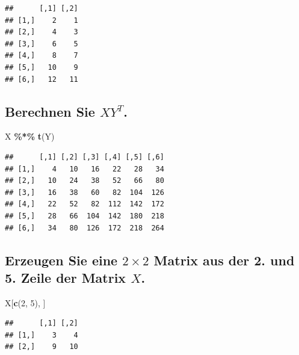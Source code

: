 \documentclass[12pt,a4paper]{article}
\newenvironment{Shaded}{\begin{snugshade}}{\end{snugshade}}
\newcommand{\DecValTok}[1]{\textcolor[rgb]{0.00,0.00,0.81}{#1}}
\newcommand{\FunctionTok}[1]{\textcolor[rgb]{0.13,0.29,0.53}{\textbf{#1}}}
\newcommand{\NormalTok}[1]{#1}
\newcommand{\SpecialCharTok}[1]{\textcolor[rgb]{0.81,0.36,0.00}{\textbf{#1}}}
\begin{document}
\begin{verbatim}
##      [,1] [,2]
## [1,]    2    1
## [2,]    4    3
## [3,]    6    5
## [4,]    8    7
## [5,]   10    9
## [6,]   12   11
\end{verbatim}

\vspace{0.5cm}

\subsection{\texorpdfstring{Berechnen Sie
\(XY^{T}\).}{Berechnen Sie XY\^{}\{T\}.}}\label{berechnen-sie-xyt.}

\begin{Shaded}
\begin{Highlighting}[]
\NormalTok{    X }\SpecialCharTok{\%*\%} \FunctionTok{t}\NormalTok{(Y)}
\end{Highlighting}
\end{Shaded}

\begin{verbatim}
##      [,1] [,2] [,3] [,4] [,5] [,6]
## [1,]    4   10   16   22   28   34
## [2,]   10   24   38   52   66   80
## [3,]   16   38   60   82  104  126
## [4,]   22   52   82  112  142  172
## [5,]   28   66  104  142  180  218
## [6,]   34   80  126  172  218  264
\end{verbatim}

\vspace{0.5cm}

\subsection{\texorpdfstring{Erzeugen Sie eine \(2 \times 2\) Matrix aus
der 2. und 5. Zeile der Matrix
\(X\).}{Erzeugen Sie eine 2 \textbackslash times 2 Matrix aus der 2. und 5. Zeile der Matrix X.}}\label{erzeugen-sie-eine-2-times-2-matrix-aus-der-2.-und-5.-zeile-der-matrix-x.}

\begin{Shaded}
\begin{Highlighting}[]
\NormalTok{    X[}\FunctionTok{c}\NormalTok{(}\DecValTok{2}\NormalTok{, }\DecValTok{5}\NormalTok{), ]}
\end{Highlighting}
\end{Shaded}

\begin{verbatim}
##      [,1] [,2]
## [1,]    3    4
## [2,]    9   10
\end{verbatim}
\end{document}

